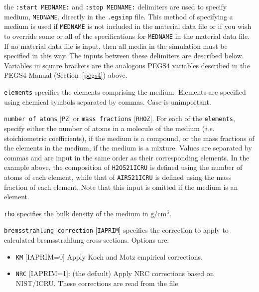 \documentclass[12pt,twoside]{article}  %
\begin{document}
\begin{description}
\item the {\tt :start MEDNAME:} and {\tt :stop MEDNAME:} delimiters are used to specify medium, {\tt MEDNAME}, directly in the
{\tt .egsinp} file.  This method of specifying a medium is used if {\tt MEDNAME} is not included in the material data file or
if you wish to override some or all of the specifications for {\tt MEDNAME} in the material data file.
If no material data file is input, then all media in the simulation
must be specified in this way.  The inputs between these delimiters are described below.  Variables
in square brackets are the analogous PEGS4 variables described in the PEGS4 Manual (Section~\ref{pegs4}) above.
\begin{description}
\item {\tt elements} specifies the elements comprising the medium.  Elements are specified using chemical symbols separated by
commas.  Case is unimportant.
\item {\tt number of atoms} $[${\tt PZ}$]$ or {\tt mass fractions} $[${\tt RHOZ}$]$.  For each of the {\tt elements}, specify either the number of atoms in a molecule of the medium ({\it i.e.} stoichiometric coefficients), if the
medium is a compound, or the mass fractions of the elements in the medium,
if the medium is a mixture.
Values are separated by commas and are input in the same order as their corresponding elements.  In the example above,
the composition of {\tt H2O521ICRU} is
defined using the number of atoms of each element, while that of {\tt AIR521ICRU} is defined using the mass fraction of each element.  Note that this input
is omitted if the medium is an element.
\item {\tt rho} specifies the bulk density of the medium in g/cm$^3$.
\item {\tt bremsstrahlung correction} $[${\tt IAPRIM}$]$ specifies the
correction to apply to calculated bremsstrahlung cross-sections.
Options are:
\begin{itemize}
\item {\tt KM} $[$IAPRIM=0$]$ Apply Koch and Motz\cite{KM59} empirical corrections.
\item {\tt NRC} $[$IAPRIM=1$]$: (the default) Apply NRC corrections based on NIST/ICRU\cite{Ro89a}.  These corrections are read from the file

\end{itemize}
\end{description}
\end{description}
\end{document}
